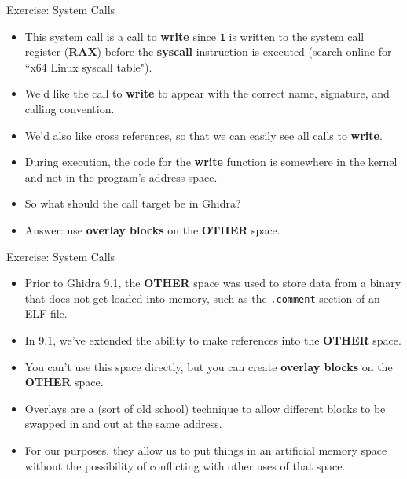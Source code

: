 \documentclass{beamer}
\begin{document}
\begin{frame}
\begin{block}{Exercise: System Calls}
\begin{itemize}
\item This system call is a call to \textbf{write} since \texttt{1} is written to the system call register (\textbf{RAX}) before the \textbf{syscall} 
instruction is executed (search online for ``x64 Linux syscall table").
\item We'd like the call to \textbf{write} to appear with the correct name, signature, and calling convention.
\item We'd also like cross references, so that we can easily see all calls to \textbf{write}.
\item During execution, the code for the \textbf{write} function is somewhere in the kernel and not in the program's address space.
\item So what should the call target be in Ghidra?
\item Answer: use \textbf{overlay blocks} on the \textbf{OTHER} space.
\end{itemize}
\end{block}
\end{frame}

\begin{frame}
\begin{block}{Exercise: System Calls}
\begin{itemize}
\item Prior to Ghidra 9.1, the \textbf{OTHER} space was used to store data from a binary that does not get loaded into memory, such as the \texttt{.comment} section of an ELF file.
\item In 9.1, we've extended the ability to make references into the \textbf{OTHER} space.
\item You can't use this space directly, but you can create \textbf{overlay blocks} on the \textbf{OTHER} space.
\item Overlays are a (sort of old school) technique to allow different blocks to be swapped in and out at the same address.  
\item For our purposes, they allow us to put things in an artificial memory space without the possibility of conflicting with other uses of that space.
\end{itemize}
\end{block}
\end{frame}
\end{document}
